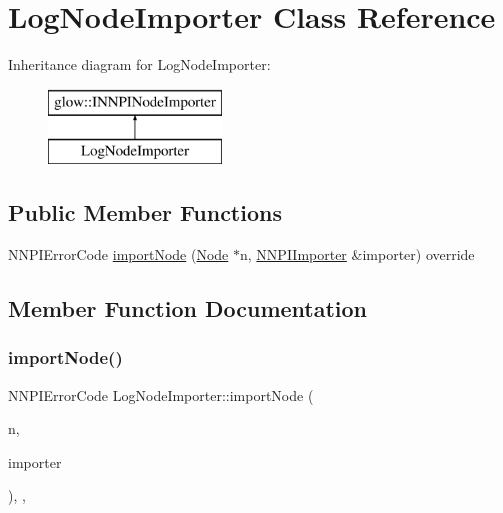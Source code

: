 \hypertarget{class_log_node_importer}{}\section{Log\+Node\+Importer Class Reference}
\label{class_log_node_importer}
Inheritance diagram for Log\+Node\+Importer\+:\begin{figure}[H]
\begin{center}
\leavevmode
\includegraphics[height=2.000000cm]{class_log_node_importer}
\end{center}
\end{figure}
\subsection*{Public Member Functions}
\begin{DoxyCompactItemize}
\item 
N\+N\+P\+I\+Error\+Code \hyperlink{class_log_node_importer_a7f344e40d964b5ea372090cdbad1ee1d}{import\+Node} (\hyperlink{classglow_1_1_node}{Node} $\ast$n, \hyperlink{classglow_1_1_n_n_p_i_importer}{N\+N\+P\+I\+Importer} \&importer) override
\end{DoxyCompactItemize}


\subsection{Member Function Documentation}
\mbox{\label{class_log_node_importer_a7f344e40d964b5ea372090cdbad1ee1d}} 
\subsubsection{\texorpdfstring{import\+Node()}{importNode()}}
{\footnotesize\ttfamily N\+N\+P\+I\+Error\+Code Log\+Node\+Importer\+::import\+Node (\begin{DoxyParamCaption}\item[{\hyperlink{classglow_1_1_node}{Node} $\ast$}]{n,  }\item[{\hyperlink{classglow_1_1_n_n_p_i_importer}{N\+N\+P\+I\+Importer} \&}]{importer }\end{DoxyParamCaption})\hspace{0.3cm}{\ttfamily [inline]}, {\ttfamily [override]}, {\ttfamily [virtual]}}

